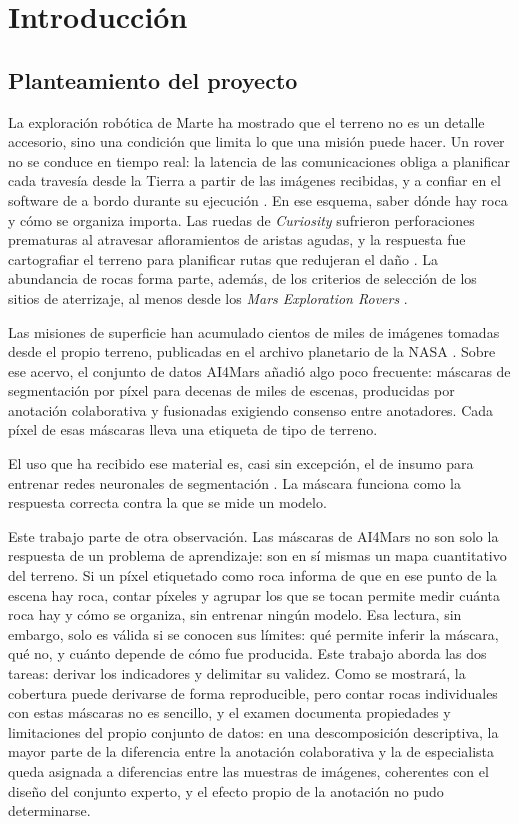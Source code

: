 \chapter{Introducción}
\label{cap:introduccion}

\section{Planteamiento del proyecto}

La exploración robótica de Marte ha mostrado que el terreno no es un detalle accesorio, sino
una condición que limita lo que una misión puede hacer. Un rover no se conduce en tiempo real:
la latencia de las comunicaciones obliga a planificar cada travesía desde la Tierra a partir de
las imágenes recibidas, y a confiar en el software de a bordo durante su ejecución
\citep{rankin2020mobility}. En ese esquema, saber dónde hay roca y cómo se organiza importa.
Las ruedas de \textit{Curiosity} sufrieron perforaciones prematuras al atravesar afloramientos
de aristas agudas, y la respuesta fue cartografiar el terreno para planificar rutas que
redujeran el daño \citep{arvidson2017wheels}. La abundancia de rocas forma parte, además, de
los criterios de selección de los sitios de aterrizaje, al menos desde los \textit{Mars
Exploration Rovers} \citep{golombek2003mer, golombek2012msl}.

Las misiones de superficie han acumulado cientos de miles de imágenes tomadas desde el propio
terreno, publicadas en el archivo planetario de la NASA \citep{nasapds2024}. Sobre ese acervo, el conjunto de datos AI4Mars \citep{swan2021ai4mars,
swan2022ai4marsdata} añadió algo poco frecuente: máscaras de segmentación por píxel para
decenas de miles de escenas, producidas por anotación colaborativa y fusionadas exigiendo
consenso entre anotadores. Cada píxel de esas máscaras lleva una etiqueta de tipo de terreno.

El uso que ha recibido ese material es, casi sin excepción, el de insumo para entrenar redes
neuronales de segmentación \citep{qu2025review}. La máscara funciona como la respuesta correcta
contra la que se mide un modelo.

Este trabajo parte de otra observación. Las máscaras de AI4Mars no son solo la respuesta de un
problema de aprendizaje: son en sí mismas un mapa cuantitativo del terreno. Si un píxel
etiquetado como roca informa de que en ese punto de la escena hay roca, contar píxeles y
agrupar los que se tocan permite medir cuánta roca hay y cómo se organiza, sin entrenar ningún
modelo. Esa lectura, sin embargo, solo es válida si se conocen sus límites: qué permite
inferir la máscara, qué no, y cuánto depende de cómo fue producida. Este trabajo aborda las dos
tareas: derivar los indicadores y delimitar su validez. Como se mostrará, la cobertura puede
derivarse de forma reproducible, pero contar rocas individuales con estas máscaras no es
sencillo, y el examen documenta propiedades y limitaciones del propio conjunto de datos: en una
descomposición descriptiva, la mayor parte de la diferencia entre la anotación colaborativa y la
de especialista queda asignada a diferencias entre las muestras de imágenes, coherentes con el
diseño del conjunto experto, y el efecto propio de la anotación no pudo determinarse.

